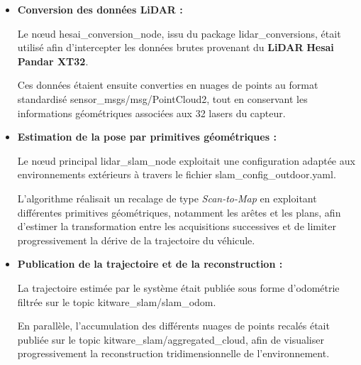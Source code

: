 \documentclass[12pt,a4paper,oneside]{report}
\newcommand{\textsb}[1]{{\fontseries{sb}\selectfont #1}}
\begin{document}
\begin{itemize}[itemsep=0.3em, label=\textbullet]

\item \textbf{Conversion des données LiDAR :}\vspace{0.05cm}

\hspace*{0.5cm}Le nœud \textsb{hesai\_conversion\_node}, issu du package \textsb{lidar\_conversions}, était utilisé afin d'intercepter les données brutes provenant du \textbf{LiDAR} \textbf{Hesai Pandar XT32}.\vspace{0.01cm}

\hspace*{0.5cm}Ces données étaient ensuite converties en nuages de points au format standardisé \textsb{sensor\_msgs/msg/PointCloud2}, tout en conservant les informations géométriques associées aux 32 lasers du capteur.

\item \textbf{Estimation de la pose par primitives géométriques :}\vspace{0.05cm}

\hspace*{0.5cm}Le nœud principal \textsb{lidar\_slam\_node} exploitait une configuration adaptée aux environnements extérieurs à travers le fichier \textsb{slam\_config\_outdoor.yaml}.\vspace{0.01cm}

\hspace*{0.5cm}L'algorithme réalisait un recalage de type \textsb{\textit{Scan-to-Map}} en exploitant différentes primitives géométriques, notamment les arêtes et les plans, afin d'estimer la transformation entre les acquisitions successives et de limiter progressivement la dérive de la trajectoire du véhicule.

\item \textbf{Publication de la trajectoire et de la reconstruction :}\vspace{0.05cm}

\hspace*{0.5cm}La trajectoire estimée par le système était publiée sous forme d'odométrie filtrée sur le topic \textsb{kitware\_slam/slam\_odom}.\vspace{0.01cm}

\hspace*{0.5cm}En parallèle, l'accumulation des différents nuages de points recalés était publiée sur le topic \textsb{kitware\_slam/aggregated\_cloud}, afin de visualiser progressivement la reconstruction tridimensionnelle de l'environnement.

\end{itemize}
\end{document}
